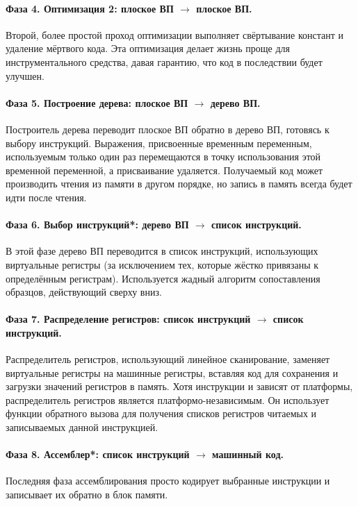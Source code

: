\documentclass[a4paper,12pt,russian]{article}
\begin{document}
\paragraph{Фаза 4. Оптимизация 2: плоское ВП $\longrightarrow$ плоское ВП.}
Второй, более простой проход оптимизации выполняет свёртывание констант и удаление мёртвого кода. Эта оптимизация делает жизнь проще для инструментального средства, давая гарантию, что код в последствии будет улучшен.

\paragraph{Фаза 5. Построение дерева: плоское ВП $\longrightarrow$ дерево ВП.}
Построитель дерева переводит плоское ВП обратно в дерево ВП, готовясь к выбору инструкций. Выражения, присвоенные временным переменным, используемым только один раз перемещаются в точку использования этой временной переменной, а присваивание удаляется. Получаемый код может производить чтения из памяти в другом порядке, но запись в память всегда будет идти после чтения.

\paragraph{Фаза 6. Выбор инструкций*: дерево ВП $\longrightarrow$ список инструкций.}
В этой фазе дерево ВП переводится в список инструкций, использующих виртуальные регистры (за исключением тех, которые жёстко привязаны к определённым регистрам). Используется жадный алгоритм сопоставления образцов, действующий сверху вниз.

\paragraph{Фаза 7. Распределение регистров: список инструкций $\longrightarrow$ список инструкций.}
Распределитель регистров, использующий линейное сканирование, заменяет виртуальные регистры на машинные регистры, вставляя код для сохранения и загрузки значений регистров в память.
Хотя инструкции и зависят от платформы, распределитель регистров является платформо-независимым.
Он использует функции обратного вызова для получения списков регистров читаемых и записываемых данной инструкцией.

\paragraph{Фаза 8. Ассемблер*: список инструкций $\longrightarrow$ машинный код.}
Последняя фаза ассемблирования просто кодирует выбранные инструкции и записывает их обратно в блок памяти.
\end{document}
